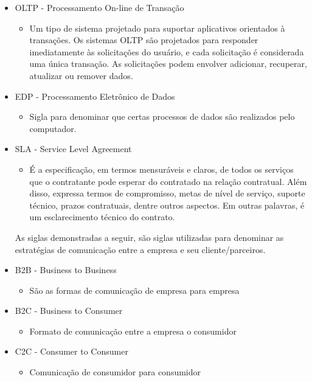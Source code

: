 \documentclass[
	12pt,				%
	openany,			%
	a4paper,			%
	chapter=TITLE,		%
	section=TITLE,		%
	english,
	brazil				%
]{abntex2}
\begin{document}
\begin{itemize}
\item OLTP - Processamento On-line de Transação
	\begin{itemize}
		\item[] Um tipo de sistema projetado para suportar aplicativos orientados à transações. Os sistemas OLTP são projetados para responder imediatamente às solicitações do usuário, e cada solicitação é considerada uma única transação. As solicitações podem envolver adicionar, recuperar, atualizar ou remover dados.
	\end{itemize}


\item EDP - Processamento Eletrônico de Dados
	\begin{itemize}
		\item[] Sigla para denominar que certas processos de dados são realizados pelo computador.
	\end{itemize}

\item SLA - Service Level Agreement
	\begin{itemize}
		\item[] É a especificação, em termos mensuráveis e claros, de todos os serviços que o contratante pode esperar do contratado na relação contratual. Além disso, expressa termos de compromisso, metas de nível de serviço, suporte técnico, prazos contratuais, dentre outros aspectos. Em outras palavras, é um esclarecimento técnico do contrato.
	\end{itemize}


\newpage
As siglas demonstradas a seguir, são siglas utilizadas para denominar as estratégias de comunicação entre a empresa e seu cliente/parceiros.

\item B2B - Business to Business
	\begin{itemize}
		\item[] São as formas de comunicação de empresa para empresa
	\end{itemize}

\item B2C - Business to Consumer
	\begin{itemize}
		\item[] Formato de comunicação entre a empresa o consumidor
	\end{itemize}

\item C2C - Consumer to Consumer
	\begin{itemize}
		\item[] Comunicação de consumidor para consumidor
	\end{itemize}


\end{itemize}
\end{document}
